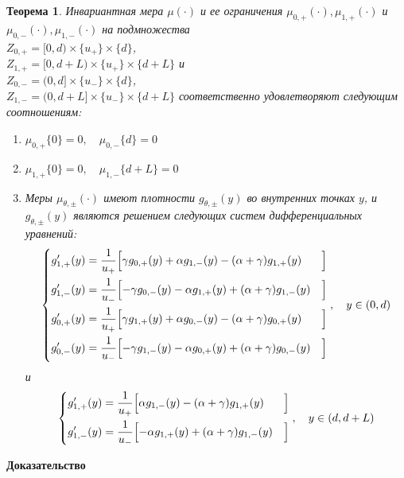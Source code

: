 \documentclass[12pt,a4paper]{article}
\newtheorem{theorem}{Теорема}
\begin{document}
\begin{theorem}
Инвариантная мера $\mu (\cdot)$ и ее ограничения $\mu_{0, +}(\cdot), \mu_{1, +}(\cdot)$ и $\mu_{0, -} (\cdot), \mu_{1, -} (\cdot)$ на подмножества
\\
$Z_{0, +} = [0, d) \times \{u_+\} \times \{d\} $, 
\\
$Z_{1, +} = [0, d + L) \times \{u_+\} \times \{d + L\} $ и
\\ $Z_{0, -} = (0, d] \times \{u_-\} \times \{d\} $, 
\\
$ Z_{1, -} = (0, d + L] \times \{u_-\} \times \{d + L\}$ соответственно удовлетворяют следующим соотношениям:
\begin{enumerate}
\parsep
\item $\mu_{0,+} \{0\} = 0,\quad \mu_{0,-} \{d\} = 0$ 
\item $\mu_{1,+} \{0\} = 0, \quad \mu_{1,-} \{d + L\} = 0$
\item Меры $\mu_{\theta, \pm} (\cdot)$ имеют плотности $g_{\theta, \pm} (y)$ во внутренних точках $y$, и $g_{\theta, \pm} (y)$ являются решением следующих систем дифференциальных уравнений:
\begin{equation}\label{syst_4}
\left\{ \begin{aligned} 
g_{1, +}'(y) &= \frac{1}{u_+} \Bigl[ \gamma g_{0, +}(y) + \alpha g_{1, -}(y) -(\alpha + \gamma) g_{1, +}(y)&\Bigr]\\
g_{1, -}'(y) &= \frac{1}{u_-} \Bigl[ -\gamma g_{0, -}(y) - \alpha g_{1, +}(y) + (\alpha + \gamma) g_{1, -}(y)&\Bigr]\\
g_{0, +}'(y) &= \frac{1}{u_+} \Bigl[ \gamma g_{1, +}(y) + \alpha g_{0, -}(y) - (\alpha + \gamma) g_{0, +}(y)&\Bigr]\\
g_{0, -}'(y) &= \frac{1}{u_-} \Bigl[ -\gamma g_{1, -}(y) - \alpha g_{0, +}(y) + (\alpha + \gamma) g_{0, -}(y)&\Bigr]
\end{aligned}
\right., \quad y \in (0, d)
\end{equation} и \begin{equation}\label{syst_2}
\left\{ \begin{aligned} 
g_{1, +}'(y) &= \frac{1}{u_+} \Bigl[ \alpha g_{1, -}(y) -(\alpha + \gamma) g_{1, +}(y)&\Bigr]\\
g_{1, -}'(y) &= \frac{1}{u_-} \Bigl[- \alpha g_{1, +}(y) + (\alpha + \gamma) g_{1, -}(y) &\Bigr]
\end{aligned}
\right., \quad y \in (d, d + L)
\end{equation}
\end{enumerate}
\end{theorem}
{\bf Доказательство}
\end{document}
